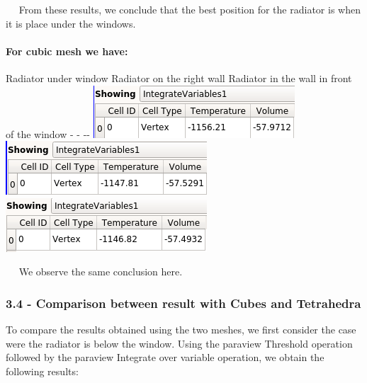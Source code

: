 \documentclass[11pt]{article}
\makeatletter
\def\maxwidth{\ifdim\Gin@nat@width>\linewidth\linewidth
    \else\Gin@nat@width\fi}
\let\Oldincludegraphics\includegraphics
\renewcommand{\includegraphics}[1]{\Oldincludegraphics[width=.8\maxwidth]{#1}}
\makeatother
\begin{document}
~ ~From these results, we conclude that the best position for the
radiator is when it is place under the windows.

\hypertarget{for-cubic-mesh-we-have}{%
\paragraph{For cubic mesh we have:}\label{for-cubic-mesh-we-have}}

Radiator under window\textbar{} Radiator on the right wall \textbar{}
Radiator in the wall in front of the window - \textbar{} - -\textbar{}-
\includegraphics{IntegrateVariabl.png} \textbar{}
\includegraphics{IntVarDroitCubs.png} \textbar{}
\includegraphics{IntVarDevantCubs.png}

~ ~We observe the same conclusion here.

    \hypertarget{comparison-between-result-with-cubes-and-tetrahedra}{%
\subsubsection{3.4 - Comparison between result with Cubes and
Tetrahedra}\label{comparison-between-result-with-cubes-and-tetrahedra}}

To compare the results obtained using the two meshes, we first consider
the case were the radiator is below the window. Using the paraview
Threshold operation followed by the paraview Integrate over variable
operation, we obtain the following results:
\end{document}

